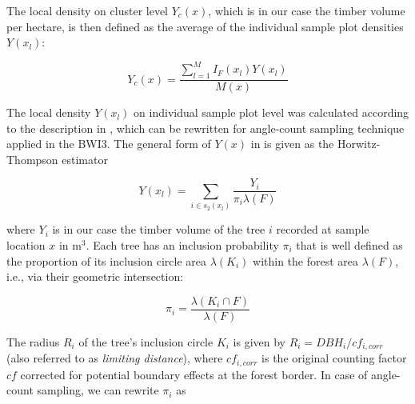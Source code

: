 The local density on cluster level $Y_{c}(x)$, which is in our case the timber volume per hectare, is then defined as the average of the individual sample plot densities $Y(x_l)$:

\begin{equation}\label{eq:locdens_clust}
Y_{c}(x) = \frac{\sum_{l=1}^{M} I_{F}(x_{l}) Y(x_l)}{M(x)}
\end{equation}

The local density $Y(x_l)$ on individual sample plot level was calculated according to the description in \citet{mandallaz2008}, which can be rewritten for angle-count sampling technique applied in the BWI3. The general form of $Y(x)$ in \citet{mandallaz2008} is given as the Horwitz-Thompson estimator 


\begin{equation}\label{eq:locdens_plot}
Y(x_l)=\sum_{i \in s_{2}(x_l)}\frac{Y_i}{\pi_{i}\lambda(F)}
\end{equation}

\noindent where $Y_i$ is in our case the timber volume of the tree $i$ recorded at sample location $x$ in m$^3$. Each tree has an inclusion probability $\pi_{i}$ that is well defined as the proportion of its inclusion circle area $\lambda(K_i)$ within the forest area $\lambda(F)$, i.e., via their geometric intersection:

%

\begin{equation}\label{locdens_plot_1}
\pi_{i} = \frac{\lambda(K_i \cap F)}{\lambda(F)}
\end{equation}

The radius $R_i$ of the tree's inclusion circle $K_i$ is given by $R_i = DBH_{i}/cf_{i,corr}$ (also referred to as \textit{limiting distance}), where $cf_{i,corr}$ is the original counting factor $cf$ corrected for potential boundary effects at the forest border. In case of angle-count sampling, we can rewrite $\pi_{i}$ as

